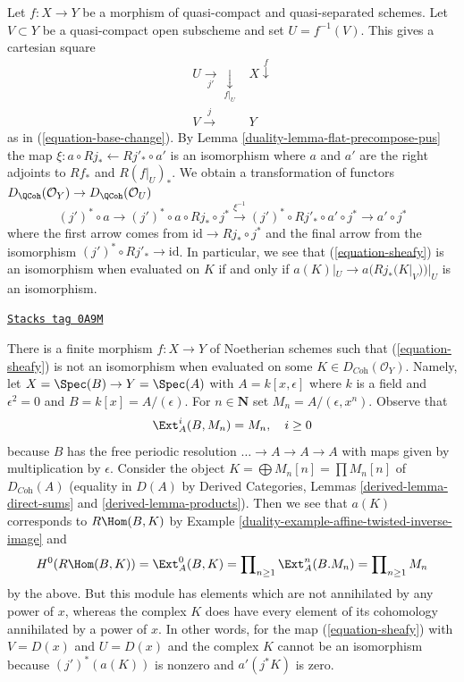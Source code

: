 Let $f : X \to Y$ be a morphism of quasi-compact and quasi-separated
schemes. Let $V \subset Y$ be a quasi-compact open subscheme and set
$U = f^{-1}(V)$. This gives a cartesian square
$$
\begin{array}{cc}U \underset{j'}{\longrightarrow}\underset{f|_U}{\downarrow} & X \overset{f}{\downarrow} \\ V \overset{j}{\longrightarrow} & Y\end{array}
$$
as in (\ref{equation-base-change}). By Lemma \ref{duality-lemma-flat-precompose-pus}
the map $\xi : a \circ Rj_* \leftarrow Rj'_* \circ a'$ is an isomorphism
where $a$ and $a'$ are the right adjoints to
$Rf_*$ and $R(f|_U)_*$. We obtain a transformation
of functors $D_\QCoh(\mathcal{O}_Y) \to D_\QCoh(\mathcal{O}_U)$
\begin{equation}
\label{equation-sheafy}
(j')^* \circ a \to
(j')^* \circ a \circ Rj_* \circ j^* \xrightarrow{\xi^{-1}}
(j')^* \circ Rj'_* \circ a' \circ j^* \to a' \circ j^*
\end{equation}
where the first arrow comes from $\text{id} \to Rj_* \circ j^*$
and the final arrow from the isomorphism $(j')^* \circ Rj'_* \to \text{id}$.
In particular, we see that (\ref{equation-sheafy}) is an isomorphism
when evaluated on $K$ if and only if $a(K)|_U \to a(Rj_*(K|_V))|_U$
is an isomorphism.

\begin{example}
\label{duality-example-not-supported-on-inverse-image}
\href{https://stacks.math.columbia.edu/tag/0A9M}{\texttt{Stacks tag 0A9M}}

There is a finite morphism $f : X \to Y$ of Noetherian schemes
such that (\ref{equation-sheafy}) is not an isomorphism
when evaluated on some
$K \in D_{\textit{Coh}}(\mathcal{O}_Y)$.
Namely, let $X = \Spec(B) \to Y = \Spec(A)$ with
$A = k[x, \epsilon]$ where $k$ is a field and $\epsilon^2 = 0$ and
$B = k[x] = A/(\epsilon)$. For $n \in \mathbf{N}$ set
$M_n = A/(\epsilon, x^n)$. Observe that
$$
\Ext^i_A(B, M_n) = M_n,\quad i \geq 0
$$
because $B$ has the free periodic resolution
$\ldots \to A \to A \to A$ with maps given by multiplication by $\epsilon$.
Consider the object
$K = \bigoplus M_n[n] = \prod M_n[n]$
of $D_{\textit{Coh}}(A)$ (equality in $D(A)$ by
Derived Categories, Lemmas \ref{derived-lemma-direct-sums} and
\ref{derived-lemma-products}). Then we see that $a(K)$ corresponds
to $R\Hom(B, K)$ by Example \ref{duality-example-affine-twisted-inverse-image} and
$$
H^0(R\Hom(B, K)) = \Ext^0_A(B, K) =
\prod\nolimits_{n \geq 1} \Ext^n_A(B. M_n) =
\prod\nolimits_{n \geq 1} M_n
$$
by the above. But this module has elements which are not
annihilated by any power of $x$, whereas the complex $K$
does have every element of its cohomology annihilated by
a power of $x$. In other words, for the map (\ref{equation-sheafy})
with $V = D(x)$ and $U = D(x)$ and the complex $K$ cannot
be an isomorphism because $(j')^*(a(K))$ is nonzero and
$a'(j^*K)$ is zero.
\end{example}

